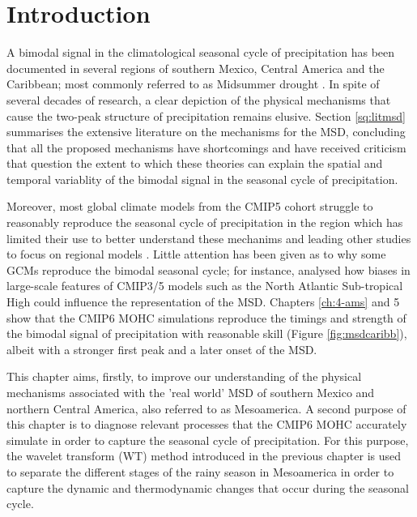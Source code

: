 \section{Introduction}

A bimodal signal in the climatological seasonal cycle of precipitation has been documented in several regions of southern Mexico, Central America and the Caribbean; most commonly referred to as Midsummer drought  \citep[MSD][]{mosino1966,magana1999,gamble2008,perdigon2018,zhao2020}.  
In spite of several decades of research, a clear depiction of the physical mechanisms that cause the two-peak structure of precipitation remains elusive. 
Section \ref{sq:litmsd} summarises the extensive literature on the mechanisms for the MSD, concluding that all the proposed mechanisms have shortcomings and have received criticism that question the extent to which these theories can explain the spatial and temporal variablity of the bimodal signal in the seasonal cycle of precipitation.

Moreover, most global climate models from the CMIP5 cohort struggle to reasonably reproduce the seasonal cycle of precipitation in the region \citep{rauscher2008,ryu2014} which has limited their use to better understand these mechanims and leading other studies to focus on regional models \citep{fuentes2015inter,cavazos2020}.  
Little attention has been given as to why some GCMs reproduce the bimodal seasonal cycle; for instance, \cite{ryu2014} analysed how biases in large-scale features of CMIP3/5 models such as the North Atlantic Sub-tropical High could influence the representation of the MSD.  
 Chapters \ref{ch:4-ams} and 5 show that the CMIP6 MOHC simulations reproduce the timings and strength of the bimodal signal of precipitation with reasonable skill (Figure \ref{fig:msdcaribb}), albeit with a stronger first peak and a later onset of the MSD. 

This chapter aims, firstly, to improve our understanding of the physical mechanisms associated with the 'real world' MSD of southern Mexico and northern Central America, also referred to as Mesoamerica. A second purpose of this chapter is to diagnose relevant processes that the CMIP6 MOHC accurately simulate in order to capture the seasonal cycle of precipitation. 
For this purpose, the wavelet transform (WT) method introduced in the previous chapter is used to separate the different stages of the rainy season in Mesoamerica in order to capture the dynamic and thermodynamic changes that occur during the seasonal cycle. 

